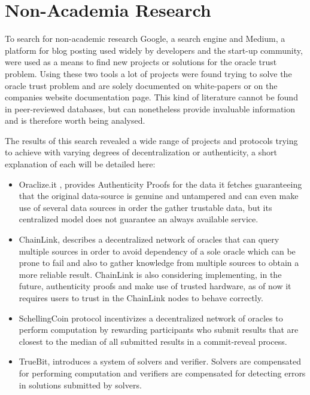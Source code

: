 \section{Non-Academia Research}

To search for non-academic research Google, a search engine and Medium, a platform for blog posting used widely by developers and the start-up community, were used as a means to find new projects or solutions for the oracle trust problem. Using these two tools a lot of projects were found trying to solve the oracle trust problem and are solely documented on white-papers or on the companies website documentation page. This kind of literature cannot be found in peer-reviewed databases, but can nonetheless provide invaluable information and is therefore worth being analysed.

The results of this search revealed a wide range of projects and protocols trying to achieve with varying degrees of decentralization or authenticity, a short explanation of each will be detailed here:

\begin{itemize}
  \item Oraclize.it \cite{Oraclize.it2018OraclizeDocumentation}, provides Authenticity Proofs for the data it fetches guaranteeing that the original data-source is genuine and untampered and can even make use of several data sources in order the gather trustable data, but its centralized model does not guarantee an always available service.
  \item ChainLink\cite{Ellis2017ChainLinkNetwork}, describes a decentralized network of oracles that can query multiple sources in order to avoid dependency of a sole oracle which can be prone to fail and also to gather knowledge from multiple sources to obtain a more reliable result. ChainLink is also considering implementing, in the future, authenticity proofs and make use of trusted hardware, as of now it requires users to trust in the ChainLink nodes to behave correctly.
  \item SchellingCoin protocol incentivizes a decentralized network of oracles
        to perform computation by rewarding participants who submit results
        that are closest to the median of all submitted results in a commit-reveal
        process.
  \item TrueBit, introduces a system of solvers and verifier. Solvers are
        compensated for performing computation and verifiers are compensated
        for detecting errors in solutions submitted by solvers.
\end{itemize}


